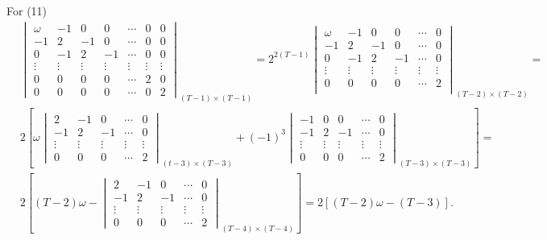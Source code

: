 \documentclass[12pt,a4paper,hyperref]{article}
\begin{document}
For (11)
\begin{align*}
&\begin{vmatrix}
 \omega & -1     & 0      & 0      & \cdots  & 0 & 0\\
  -1    & 2      & -1     & 0      & \cdots  & 0 & 0\\
   0    & -1     & 2      & -1     &  \cdots & 0 &0 \\
\vdots  & \vdots & \vdots & \vdots & \vdots  & \vdots & \vdots \\
 0      & 0      & 0      & 0      & \cdots  & 2 &  0\\
 0      & 0      & 0      & 0      &  \cdots & 0 & 2
\end{vmatrix}
_{(T-1) \times (T-1)}
= 2^{2(T-1)}
\begin{vmatrix}
 \omega & -1     & 0      & 0      & \cdots  & 0 \\
  -1    & 2      & -1     & 0      & \cdots  & 0 \\
   0    & -1     & 2      & -1     &  \cdots & 0  \\
\vdots  & \vdots & \vdots & \vdots & \vdots  & \vdots  \\
 0      & 0      & 0      & 0      & \cdots  & 2 \\
\end{vmatrix}
_{(T-2) \times (T-2)}
=  \\
& 2[ \omega
\begin{vmatrix}
 2      & -1     & 0      & \cdots  & 0  \\
 -1     & 2      & -1     &  \cdots &  0 \\
 \vdots & \vdots & \vdots & \vdots  & \vdots  \\
 0      & 0      & 0      & \cdots  & 2
\end{vmatrix}
_{(t-3) \times (T-3)} +(-1)^{3}
\begin{vmatrix}
-1     & 0      & 0      & \cdots  & 0  \\
-1     & 2      & -1     &  \cdots &  0 \\
 \vdots & \vdots & \vdots & \vdots  & \vdots  \\
  0      & 0      & 0      & \cdots  & 2
\end{vmatrix}
_{(T-3) \times (T-3)}]
= \\
& 2[ (T-2)\omega -
\begin{vmatrix}
2      & -1     & 0      & \cdots  & 0  \\
 -1     & 2      & -1     &  \cdots &  0 \\
 \vdots & \vdots & \vdots & \vdots  & \vdots  \\
 0      & 0      & 0      & \cdots  & 2
\end{vmatrix}
_{(T-4) \times (T-4)}]
= 2[ (T-2)\omega - (T-3)].
\end{align*}
\end{document}
